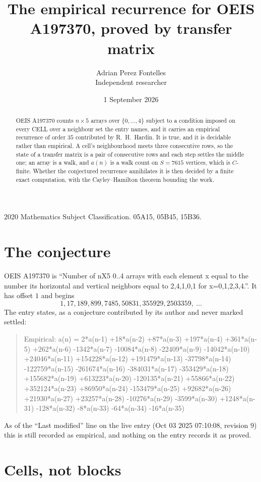 \documentclass[11pt,a4paper]{article}
\title{The empirical recurrence for OEIS A197370, proved by transfer matrix}
\author{Adrian Perez Fontelles\\ \small Independent researcher}
\date{1 September 2026}
\theoremstyle{plain}
\theoremstyle{definition}
\begin{document}
\maketitle

\begin{abstract}
OEIS A197370 counts $n\times5$ arrays over $\{0,\dots,4\}$ subject to a condition imposed on
every CELL over a neighbour set the entry names, and it carries an empirical recurrence of
order $35$ contributed by R.~H.~Hardin. It is true, and it is decidable rather than
empirical. A cell's neighbourhood meets three consecutive rows, so the state of a transfer
matrix is a pair of consecutive rows and each step settles the middle one; an array is a
walk, and $a(n)$ is a walk count on $S=7615$ vertices, which is $C$-finite. Whether the
conjectured recurrence annihilates it is then decided by a finite exact computation, with the
Cayley--Hamilton theorem bounding the work.
\end{abstract}

\noindent\small 2020 Mathematics Subject Classification. 05A15, 05B45, 15B36.\normalsize

\section{The conjecture}

OEIS A197370 is ``Number of nX5 0..4 arrays with each element x equal to the number its horizontal and vertical neighbors equal to 2,4,1,0,1 for x=0,1,2,3,4.''. It has offset $1$ and begins
\[
1, 17, 189, 899, 7485, 50831, 355929, 2503359,\ \dots
\]
The entry states, as a conjecture contributed by its author and never marked settled:
\begin{quote}
Empirical: a(n) = 2*a(n-1) +18*a(n-2) +87*a(n-3) +197*a(n-4) +361*a(n-5) +262*a(n-6) -1342*a(n-7) -10084*a(n-8) -22409*a(n-9) -14042*a(n-10) +24046*a(n-11) +154228*a(n-12) +191479*a(n-13) -37798*a(n-14) -122759*a(n-15) -261674*a(n-16) -384031*a(n-17) -353429*a(n-18) +155682*a(n-19) +613223*a(n-20) -120135*a(n-21) +55866*a(n-22) +352124*a(n-23) +86950*a(n-24) -153479*a(n-25) +92682*a(n-26) +21930*a(n-27) +23257*a(n-28) -10276*a(n-29) -3599*a(n-30) +1248*a(n-31) -128*a(n-32) -8*a(n-33) -64*a(n-34) -16*a(n-35)
\end{quote}
As of the ``Last modified'' line on the live entry (Oct 03 2025 07:10:08, revision 9) this is still
recorded as empirical, and nothing on the entry records it as proved.

\section{Cells, not blocks}
\end{document}
